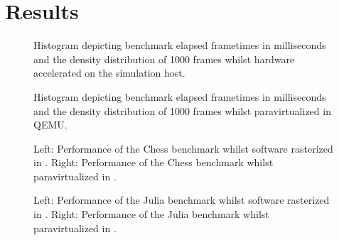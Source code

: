 
\chapter{Results}
\label{cha:results}



\begin{figure}
\begin{center}
	

	\label{fig:results_hosthistograms}
	\caption{Histogram depicting benchmark elapsed frametimes in milliseconds and the density distribution of 1000 frames whilst hardware accelerated on the simulation host.}
\end{center}
\end{figure}

\begin{figure}
\begin{center}
	

	\label{fig:results_qemuhistograms}
	\caption{Histogram depicting benchmark elapsed frametimes in milliseconds and the density distribution of 1000 frames whilst paravirtualized in QEMU.}
\end{center}
\end{figure}

\begin{sidewaysfigure}
\begin{center}
	

	\label{simicsparachesshistograms}
	\caption{Left: Performance of the Chess benchmark whilst software rasterized in \dvttermsimics . Right: Performance of the Chess benchmark whilst paravirtualized in \dvttermsimics .}
\end{center}
\end{sidewaysfigure}

\begin{sidewaysfigure}
\begin{center}
	

    \label{fig:results_simicsparajuliahistograms}
    \caption{Left: Performance of the Julia benchmark whilst software rasterized in \dvttermsimics . Right: Performance of the Julia benchmark whilst paravirtualized in \dvttermsimics .}
\end{center}
\end{sidewaysfigure}

